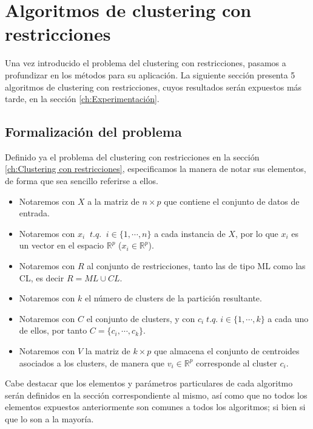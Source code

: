 \chapter{Algoritmos de clustering con restricciones}\label{ch:Algoritmos}

Una vez introducido el problema del clustering con restricciones, pasamos a profundizar en los métodos para su aplicación. La siguiente sección presenta 5 algoritmos de clustering con restricciones, cuyos resultados serán expuestos más tarde, en la sección \ref{ch:Experimentación}.

\section{Formalización del problema}

Definido ya el problema del clustering con restricciones en la sección \ref{ch:Clustering con restricciones}, especificamos la manera de notar sus elementos, de forma que sea sencillo referirse a ellos.

\begin{itemize}
	
	\item Notaremos con $X$ a la matriz de $n\times p$ que contiene el conjunto de datos de entrada.
	
	\item Notaremos con $x_i \;\; t.q. \;\; i \in \{1, \cdots, n\}$ a cada instancia de $X$, por lo que $x_i$ es un vector en el espacio $\mathbb{R}^p$ ($x_i \in \mathbb{R}^p$).
	
	\item Notaremos con $R$ al conjunto de restricciones, tanto las de tipo \acs{ML} como las \acs{CL}, es decir $R = ML \cup CL$. 
	
	\item Notaremos con $k$ el número de clusters de la partición resultante.
	
	\item Notaremos con $C$ el conjunto de clusters, y con $c_i \; t.q. \; i \in \{1, \cdots, k\}$ a cada uno de ellos, por tanto $C = \{c_i, \cdots, c_k\}$.
	
	\item Notaremos con $V$ la matriz de $k\times p$ que almacena el conjunto de centroides asociados a los clusters, de manera que $v_i \in \mathbb{R}^p$ corresponde al cluster $c_i$.
	
\end{itemize}
Cabe destacar que los elementos y parámetros particulares de cada algoritmo serán definidos en la sección correspondiente al mismo, así como que no todos los elementos expuestos anteriormente son comunes a todos los algoritmos; si bien si que lo son a la mayoría.

